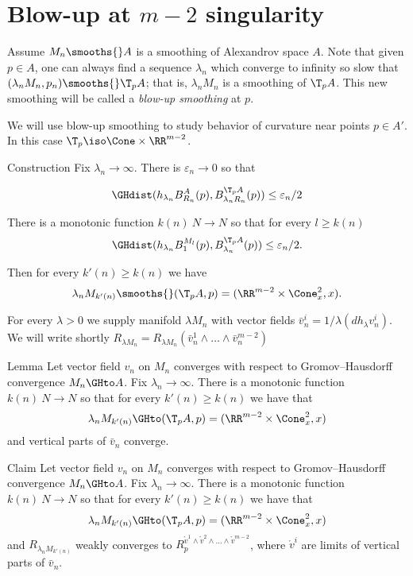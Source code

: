 

\section{Blow-up at $m-2$ singularity}\label{sec:blow}

Assume $M_n\smooths{} A$ is a smoothing of Alexandrov space $A$.
Note that given $p\in A$,
one can always find a sequence $\lambda_n$
which converge to infinity so slow that
$(\lambda_n M_n,p_n)\smooths{} \T_p A$;
that is, $\lambda_n M_n$ is a smoothing of $\T_pA$.
This new smoothing will be called a \emph{blow-up smoothing} at $p$.

We will use blow-up smoothing to study behavior of curvature near points $p\in A'$.
In this case $\T_p\iso\Cone\times \RR^{m-2}$.






\begin{thm}{Construction}\label{constr}
Fix $\lambda_n\to\infty$. There is $\varepsilon_n\to 0$ so that

$$\GHdist(h_{\lambda_n}B^A_{R_n}(p), B^{\T_p A}_{\lambda_n R_n}(p))\le\varepsilon_n/2$$

There is a monotonic function
 $k(n)\:N\to N$
so that for every $l\ge k(n)$
$$\GHdist(h_{\lambda_n}B^{M_l}_{1}(p), B^{\T_p A}_{\lambda_n}(p))\le\varepsilon_n/2.$$

Then for every  $k'(n)\ge k(n)$ we have
$$\lambda_n M_{k'(n)}\smooths{} (\T_p A, p)=(\RR^{m-2}\times \Cone_x^2,x).$$
\end{thm}
For every $\lambda>0$ we supply manifold $\lambda M_n$
with vector fields
$\bar v_n^i=1/\lambda(d h_{\lambda}v_n^i)$. We will write shortly
$R_{\lambda M_n}=R_{\lambda M_n}(\bar v_n^1\wedge\dots\wedge\bar v_n^{m-2})$

\begin{thm}{Lemma}\label{l:convVCone}
Let vector field $v_n$ on $M_n$
converges with respect to Gromov--Hausdorff
convergence $M_n\GHto A$.
Fix $\lambda_n\to\infty$.
There is a monotonic function
 $k(n)\:N\to N$ so that  for every  $k'(n)\ge k(n)$
 we have that
$$\lambda_n M_{k'(n)}\GHto (\T_p A, p)=(\RR^{m-2}\times \Cone_x^2,x)$$
and
vertical parts of $\bar v_n$ converge.
\end{thm}

\begin{thm}{Claim}\label{cl:convVCone}
Let vector field $v_n$ on $M_n$
converges with respect to Gromov--Hausdorff
convergence $M_n\GHto A$.
Fix $\lambda_n\to\infty$.
There is a monotonic function
 $k(n)\:N\to N$ so that  for every  $k'(n)\ge k(n)$
 we have that
$$\lambda_n M_{k'(n)}\GHto (\T_p A, p)=(\RR^{m-2}\times \Cone_x^2,x)$$
and
$R_{\lambda_n M_{k'(n)}}$
weakly converges to $R^{\mathring{v}^1\wedge \mathring{v}^2\wedge\dots\wedge \mathring{v}^{m-2}}_p$,
where $\mathring{v}^i$ are limits of vertical parts of $\bar v_n$.
\end{thm}

